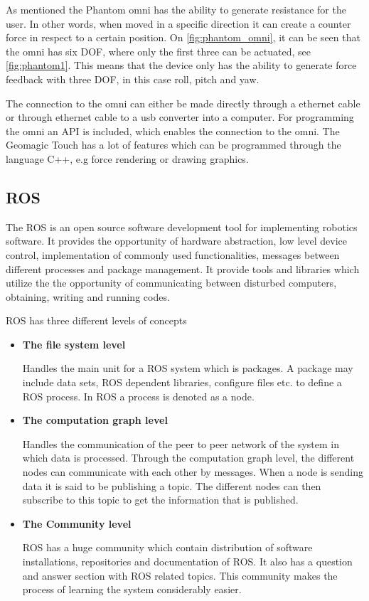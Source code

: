 \documentclass[conference]{IEEEtran}
\begin{document}
As mentioned the Phantom omni has the ability to generate resistance for the user. In other words, when moved in a specific direction it can create a counter force in respect to a certain position. On \ref{fig:phantom_omni}, it can be seen that the omni has six DOF, where only the first three can be actuated, see \ref{fig:phantom1}. This means that the device only has the ability to generate force feedback with three DOF, in this case roll, pitch and yaw.

The connection to the omni can either be made directly through a ethernet cable or through ethernet cable to a usb converter into a computer. For programming the omni an API is included, which enables the connection to the omni. The Geomagic Touch has a lot of features which can be programmed through the language C++, e.g force rendering or drawing graphics.

\subsection{ROS}
The ROS is an open source software development tool for implementing robotics software. It provides the opportunity of hardware abstraction, low level device control, implementation of commonly used functionalities, messages between different processes and package management.%
 It provide tools and libraries which utilize the the opportunity of communicating between disturbed computers, obtaining, writing and running codes.
 
ROS has three different levels of concepts\cite{Wiki_ros_concepts}

\begin{itemize}
\item \textbf{The file system level}

Handles the main unit for a ROS system which is packages. A package may include data sets, ROS dependent libraries, configure files etc. to define a ROS process. In ROS a process is denoted as a node. 
\item \textbf{The computation graph level}

Handles the communication of the peer to peer network of the system in which data is processed. Through the computation graph level, the different nodes can communicate with each other by messages. When a node is sending data it is said to be publishing a topic. The different nodes can then subscribe to this topic to get the information that is published.
\item \textbf{The Community level}

ROS has a huge community which contain distribution of software installations, repositories and documentation of ROS. It also has a question and answer section with ROS related topics.
This community makes the process of learning the system considerably easier.
\end{itemize}
\end{document}

